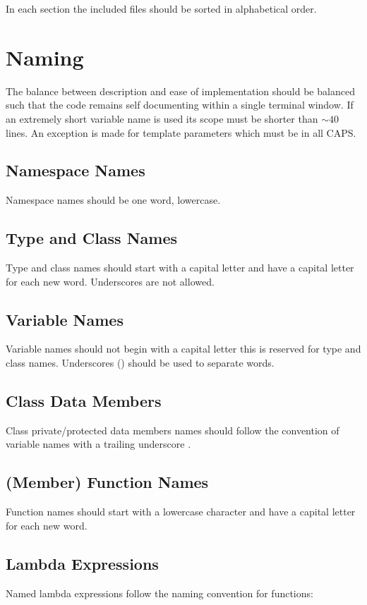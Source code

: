 In each section the included files should be sorted in alphabetical order.

\section{Naming}
The balance between description and ease of implementation should be balanced such that the code remains self documenting within a single terminal window.  If an extremely short variable name is used its scope must be shorter than $\sim 40$ lines. An exception is made for template parameters which must be in all CAPS.

\subsection{Namespace Names}
Namespace names should be one word, lowercase.

\subsection{Type and Class Names}
Type and class names should start with a capital letter and have a capital letter for each new word.
Underscores \inlinecode{_} are not allowed. 

\subsection{Variable Names}
Variable names should not begin with a capital letter this is reserved for type and class names. Underscores (\inlinecode{_}) should be used to separate words.

\subsection{Class Data Members}
Class private/protected data members names should follow the convention of variable names with a trailing underscore \inlinecode{_}.

\subsection{(Member) Function Names}
Function names should start with a lowercase character and have a capital letter for each new word.

\subsection{Lambda Expressions}
Named lambda expressions follow the naming convention for functions:

